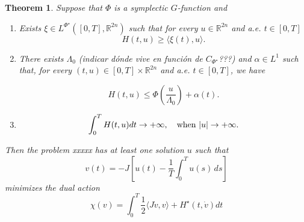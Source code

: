 \documentclass[twoside]{article}
\makeatletter
\newtheorem{thm}{Theorem}[section]
\theoremstyle{remark}
\newcommand{\labitem}[2]{%
\def\@itemlabel{#1}
\item
\def\@currentlabel{#1}\label{#2}}
\newcommand{\lpsi}{L^{\Phi^{\star}}}
\newcommand{\rr}{\mathbb{R}}
\renewcommand{\leq}{\leqslant}
\renewcommand{\geq}{\geqslant}
\makeatother
\begin{document}
\begin{thm}\label{thm:solution-ham} Suppose that $\Phi$ is a symplectic $G$-function and
\begin{enumerate}
 \labitem{H1)}{it:hip1}   Exists $\xi\in\lpsi([0,T],\rr^{2n})$ such that for every $u \in \rr^{2n}$ 
and a.e. $t \in [0,T]$
 \[H(t,u)\geq \langle \xi(t), u\rangle.
  \]
	
 \labitem{H2)}{it:hip2} There exists $\Lambda_0$ \textcolor[rgb]{1,0,0}{(indicar d\'onde vive en funci\'on de $C_{\Phi^{\star}}$???)} 
and $\alpha \in L^1 $
such that, for every $(t,u)\in [0,T]\times\rr^{2n}$ and a.e. $t \in [0,T]$, we have

 \[
  H(t,u)\leq \Phi\left( \frac{u}{\Lambda_0}\right)+\alpha(t).
 \]
 \labitem{H3)}{it:hip3} 
 \[
  \int_0^TH(t,u)dt\to+\infty,\quad\hbox{when } |u|\to+\infty.
 \]

\end{enumerate}

Then the problem xxxxx has at least one solution $u$ such that 
\[
v(t)=-J\left[u(t)-\frac{1}{T}\int_0^T u(s)\,ds\right]
\]
minimizes the dual action
\[
\chi(v)= \int_0^T \frac{1}{2} \langle J\dot{v},v\rangle+H^{\star}(t,\dot{v})  dt
\]

\end{thm}
\end{document}
